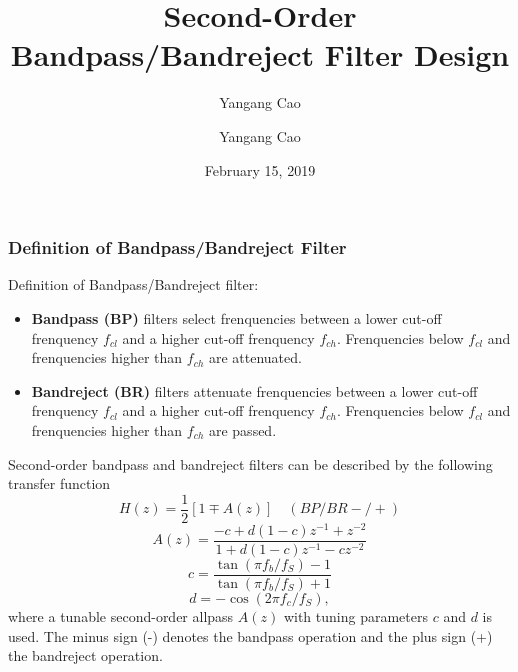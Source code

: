 \documentclass[10pt,a4paper,oneside]{beamer}
\author{Yangang Cao}
\author{Yangang Cao}
\title{Second-Order Bandpass/Bandreject Filter Design}
\date{February 15, 2019}
\begin{document}
	
	\frame[plain]{\titlepage}
	

\begin{frame}
\frametitle{Definition of Bandpass/Bandreject Filter}
\vspace{1.5cm}
 Definition of Bandpass/Bandreject filter:
\vspace{0.3cm}
\begin{itemize}
	\item {\bfseries Bandpass (BP)} filters select frenquencies between a lower cut-off frenquency $f_{cl}$ and a higher cut-off frenquency $f_{ch}$. Frenquencies below $f_{cl}$ and frenquencies higher than $f_{ch}$ are attenuated.
	\item {\bfseries Bandreject (BR)} filters attenuate frenquencies between a lower cut-off frenquency $f_{cl}$ and a higher cut-off frenquency $f_{ch}$. Frenquencies below $f_{cl}$ and frenquencies higher than $f_{ch}$ are passed.
\end{itemize}
\end{frame}

\begin{frame}
Second-order bandpass and bandreject filters can be described by the following transfer function
\[
H(z) = \frac{1}{2}[1 \mp A(z)]\quad(BP/BR-/+)
\]
\[
A(z) = \frac{-c + d(1-c)z^{-1} + z^{-2}}{1 + d(1-c)z^{-1} - cz^{-2}}
\]
\[
c = \frac{\tan(\pi f_b/f_S) - 1}{\tan(\pi f_b/f_S) + 1}
\]
\[
d = -\cos(2\pi f_c/f_S),
\]
where a tunable second-order allpass $A(z)$ with tuning parameters $c$ and $d$ is used. The minus sign (-) denotes the bandpass operation and the plus sign (+) the bandreject operation.
\end{frame}
\end{document}
